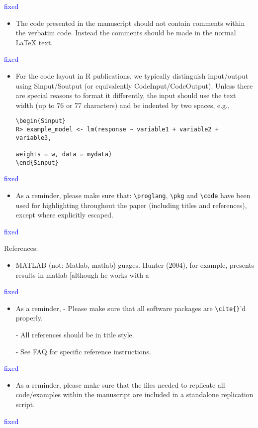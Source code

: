 \documentclass[12pt]{article}
\begin{document}
\textcolor{blue}{fixed}

\begin{itemize}
\item The code presented in the manuscript should not contain comments
within the verbatim code. Instead the comments should be made in the
normal LaTeX text.
\end{itemize}

\textcolor{blue}{fixed}


\begin{itemize}
  \item For the code layout in R publications, we typically distinguish
input/output using Sinput/Soutput (or equivalently
CodeInput/CodeOutput). Unless there are special reasons to format it
differently, the input should use the text width (up to 76 or 77
characters) and be indented by two spaces, e.g.,

\begin{verbatim}
\begin{Sinput}
R> example_model <- lm(response ~ variable1 + variable2 + variable3,

weights = w, data = mydata)
\end{Sinput}
\end{verbatim}
\end{itemize}

\textcolor{blue}{fixed}

\begin{itemize}
  \item
 As a reminder, please make sure that: \verb+\proglang+, \verb+\pkg+
 and \verb+\code+ have been used for highlighting throughout the paper
 (including titles and references), except where explicitly escaped.
\end{itemize}
\textcolor{blue}{fixed}


References:

\begin{itemize}
      \item MATLAB (not: Matlab, matlab)
guages. Hunter (2004), for example, presents results in matlab [although he works with a
\end{itemize}

\textcolor{blue}{fixed}

\begin{itemize}
\item As a reminder,
- Please make sure that all software packages are \verb+\cite{}+'d properly.

- All references should be in title style.

- See FAQ for specific reference instructions.
\end{itemize}

\textcolor{blue}{fixed}

\begin{itemize}
\item As a reminder, please make sure that the files needed to replicate
all code/examples within the manuscript are included in a standalone
replication script.
\end{itemize}
\textcolor{blue}{fixed}
\end{document}
